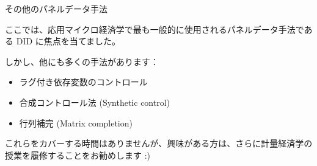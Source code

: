 \documentclass[11pt,handout]{beamer}
\newenvironment{wideitemize}{\itemize\addtolength{\itemsep}{10pt}}{\enditemize}
\begin{document}
\begin{frame}{その他のパネルデータ手法}
	\begin{wideitemize}
		\item 
		ここでは、応用マイクロ経済学で最も一般的に使用されるパネルデータ手法である DID に焦点を当てました。
		
		\item
		しかし、他にも多くの手法があります：
		
		\begin{itemize}
			\item 
			ラグ付き依存変数のコントロール
			
			\item
			合成コントロール法 (Synthetic control)
			
			\item
			行列補完 (Matrix completion)
		\end{itemize}
	
		\item
		これらをカバーする時間はありませんが、興味がある方は、さらに計量経済学の授業を履修することをお勧めします :) 
	\end{wideitemize}
\end{frame}
\end{document}
